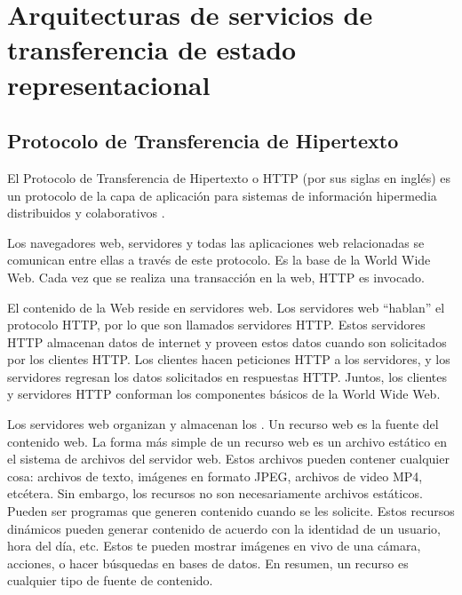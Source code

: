 
\section{Arquitecturas de servicios de transferencia de estado representacional}
\label{\detokenize{chapter_one/rest:arquitecturas-de-servicios-de-transferencia-de-estado-representacional}}\label{\detokenize{chapter_one/rest::doc}}

\subsection{Protocolo de Transferencia de Hipertexto}
\label{\detokenize{chapter_one/rest:protocolo-de-transferencia-de-hipertexto}}
\begin{remark}
El Protocolo de Transferencia de Hipertexto o HTTP (por sus siglas en inglés)
es un protocolo de la capa de aplicación para sistemas de información
hipermedia distribuidos y colaborativos \cite{fieldinghttp}.

\end{remark}

Los navegadores web, servidores y todas las aplicaciones web
relacionadas se comunican entre ellas a través de este protocolo. Es la
base de la World Wide Web. Cada vez que se realiza una transacción en la
web, HTTP es invocado.

El contenido de la Web reside en servidores web. Los servidores web
“hablan” el protocolo HTTP, por lo que son llamados servidores HTTP.
Estos servidores HTTP almacenan datos de internet y proveen estos datos
cuando son solicitados por los clientes HTTP. Los clientes hacen
peticiones HTTP a los servidores, y los servidores regresan los datos
solicitados en respuestas HTTP. Juntos, los clientes y servidores HTTP
conforman los componentes básicos de la World Wide Web.

Los servidores web organizan y almacenan los . Un recurso
web es la fuente del contenido web. La forma más simple de un recurso
web es un archivo estático en el sistema de archivos del servidor web.
Estos archivos pueden contener cualquier cosa: archivos de texto,
imágenes en formato JPEG, archivos de video MP4, etcétera. Sin embargo,
los recursos no son necesariamente archivos estáticos. Pueden ser
programas que generen contenido cuando se les solicite. Estos recursos
dinámicos pueden generar contenido de acuerdo con la identidad de un
usuario, hora del día, etc. Estos te pueden mostrar imágenes en vivo de
una cámara, acciones, o hacer búsquedas en bases de datos.
En resumen, un recurso es cualquier tipo de fuente de contenido.

